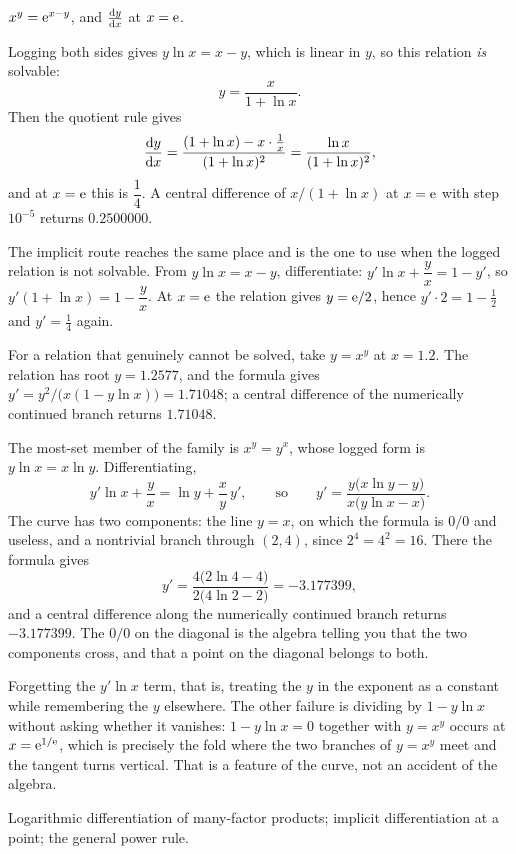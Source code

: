 \begin{worked}
$x^{y}=\mathrm{e}^{x-y}$, and $\frac{\mathrm{d}y}{\mathrm{d}x}$ at $x=\mathrm{e}$.

Logging both sides gives $y\ln x=x-y$, which is linear in $y$, so this relation \emph{is} solvable:
\[
y=\frac{x}{1+\ln x}.
\]
Then the quotient rule gives
\[
\frac{\mathrm{d}y}{\mathrm{d}x}=\frac{(1+\ln x)-x\cdot\tfrac1x}{(1+\ln x)^{2}}=\frac{\ln x}{(1+\ln x)^{2}},
\]
and at $x=\mathrm{e}$ this is $\dfrac{1}{4}$. A central difference of $x/(1+\ln x)$ at $x=\mathrm{e}$ with step $10^{-5}$ returns $0.2500000$.

The implicit route reaches the same place and is the one to use when the logged relation is not solvable. From $y\ln x=x-y$, differentiate: $y'\ln x+\dfrac{y}{x}=1-y'$, so $y'(1+\ln x)=1-\dfrac{y}{x}$. At $x=\mathrm{e}$ the relation gives $y=\mathrm{e}/2$, hence $y'\cdot2=1-\tfrac12$ and $y'=\tfrac14$ again.

For a relation that genuinely cannot be solved, take $y=x^{y}$ at $x=1.2$. The relation has root $y=1.2577$, and the formula gives $y'=y^{2}/\bigl(x(1-y\ln x)\bigr)=1.71048$; a central difference of the numerically continued branch returns $1.71048$.

The most-set member of the family is $x^{y}=y^{x}$, whose logged form is $y\ln x=x\ln y$. Differentiating,
\[
y'\ln x+\frac{y}{x}=\ln y+\frac{x}{y}\,y',\qquad\text{so}\qquad y'=\frac{y\bigl(x\ln y-y\bigr)}{x\bigl(y\ln x-x\bigr)} .
\]
The curve has two components: the line $y=x$, on which the formula is $0/0$ and useless, and a nontrivial branch through $(2,4)$, since $2^{4}=4^{2}=16$. There the formula gives
\[
y'=\frac{4\bigl(2\ln4-4\bigr)}{2\bigl(4\ln2-2\bigr)}=-3.177399 ,
\]
and a central difference along the numerically continued branch returns $-3.177399$. The $0/0$ on the diagonal is the algebra telling you that the two components cross, and that a point on the diagonal belongs to both.
\end{worked}

\begin{trap}
Forgetting the $y'\ln x$ term, that is, treating the $y$ in the exponent as a constant while remembering the $y$ elsewhere. The other failure is dividing by $1-y\ln x$ without asking whether it vanishes: $1-y\ln x=0$ together with $y=x^{y}$ occurs at $x=\mathrm{e}^{1/\mathrm{e}}$, which is precisely the fold where the two branches of $y=x^{y}$ meet and the tangent turns vertical. That is a feature of the curve, not an accident of the algebra.
\end{trap}

\begin{seealsob}Logarithmic differentiation of many-factor products; implicit differentiation at a point; the general power rule.\end{seealsob}

